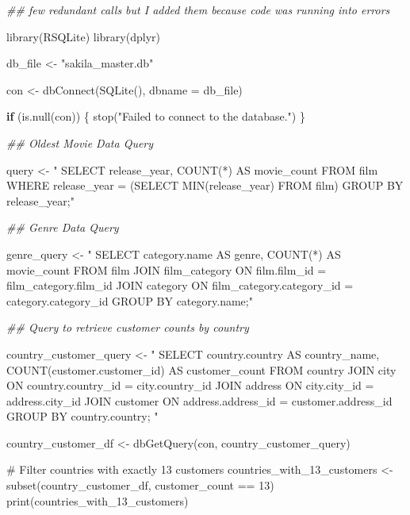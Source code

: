 \documentclass[
  12pt,
]{article}
\newenvironment{Shaded}{\begin{snugshade}}{\end{snugshade}}
\newcommand{\AttributeTok}[1]{\textcolor[rgb]{0.40,0.45,0.13}{#1}}
\newcommand{\CommentTok}[1]{\textcolor[rgb]{0.37,0.37,0.37}{#1}}
\newcommand{\ControlFlowTok}[1]{\textcolor[rgb]{0.00,0.23,0.31}{\textbf{#1}}}
\newcommand{\DecValTok}[1]{\textcolor[rgb]{0.68,0.00,0.00}{#1}}
\newcommand{\DocumentationTok}[1]{\textcolor[rgb]{0.37,0.37,0.37}{\textit{#1}}}
\newcommand{\FunctionTok}[1]{\textcolor[rgb]{0.28,0.35,0.67}{#1}}
\newcommand{\NormalTok}[1]{\textcolor[rgb]{0.00,0.23,0.31}{#1}}
\newcommand{\OtherTok}[1]{\textcolor[rgb]{0.00,0.23,0.31}{#1}}
\newcommand{\SpecialCharTok}[1]{\textcolor[rgb]{0.37,0.37,0.37}{#1}}
\newcommand{\StringTok}[1]{\textcolor[rgb]{0.13,0.47,0.30}{#1}}
\begin{document}
\begin{Shaded}
\begin{Highlighting}[]
\DocumentationTok{\#\# few redundant calls but I added them because code was running into errors}

\FunctionTok{library}\NormalTok{(RSQLite)}
\FunctionTok{library}\NormalTok{(dplyr)}

\NormalTok{db\_file }\OtherTok{\textless{}{-}} \StringTok{"sakila\_master.db"}  

\NormalTok{con }\OtherTok{\textless{}{-}} \FunctionTok{dbConnect}\NormalTok{(}\FunctionTok{SQLite}\NormalTok{(), }\AttributeTok{dbname =}\NormalTok{ db\_file)}


\ControlFlowTok{if}\NormalTok{ (}\FunctionTok{is.null}\NormalTok{(con)) \{}
    \FunctionTok{stop}\NormalTok{(}\StringTok{"Failed to connect to the database."}\NormalTok{)}
\NormalTok{\}}

\DocumentationTok{\#\# Oldest Movie Data Query }

\NormalTok{query }\OtherTok{\textless{}{-}} \StringTok{"}
\StringTok{SELECT release\_year, COUNT(*) AS movie\_count }
\StringTok{FROM film }
\StringTok{WHERE release\_year = (SELECT MIN(release\_year) FROM film) }
\StringTok{GROUP BY release\_year;"}

\DocumentationTok{\#\# Genre Data Query  }

\NormalTok{genre\_query }\OtherTok{\textless{}{-}} \StringTok{"}
\StringTok{SELECT category.name AS genre, COUNT(*) AS movie\_count }
\StringTok{FROM film }
\StringTok{JOIN film\_category ON film.film\_id = film\_category.film\_id }
\StringTok{JOIN category ON film\_category.category\_id = category.category\_id }
\StringTok{GROUP BY category.name;"}

\DocumentationTok{\#\# Query to retrieve customer counts by country}

\NormalTok{country\_customer\_query }\OtherTok{\textless{}{-}} \StringTok{"}
\StringTok{  SELECT country.country AS country\_name, COUNT(customer.customer\_id) AS customer\_count}
\StringTok{  FROM country}
\StringTok{  JOIN city ON country.country\_id = city.country\_id}
\StringTok{  JOIN address ON city.city\_id = address.city\_id}
\StringTok{  JOIN customer ON address.address\_id = customer.address\_id}
\StringTok{  GROUP BY country.country;}
\StringTok{"}

\NormalTok{country\_customer\_df }\OtherTok{\textless{}{-}} \FunctionTok{dbGetQuery}\NormalTok{(con, country\_customer\_query)}

\CommentTok{\# Filter countries with exactly 13 customers}
\NormalTok{countries\_with\_13\_customers }\OtherTok{\textless{}{-}} \FunctionTok{subset}\NormalTok{(country\_customer\_df, customer\_count }\SpecialCharTok{==} \DecValTok{13}\NormalTok{)}
\FunctionTok{print}\NormalTok{(countries\_with\_13\_customers)}
\end{Highlighting}
\end{Shaded}
\end{document}

